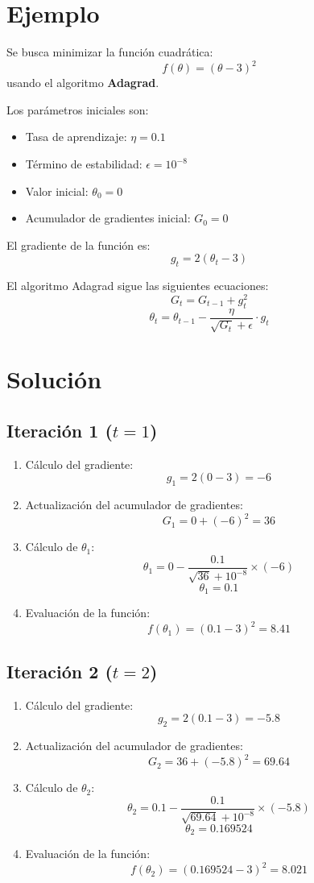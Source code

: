 \documentclass[a5paper]{article}
\begin{document}
	\section*{Ejemplo}
	Se busca minimizar la función cuadrática:
	\[
	f(\theta) = (\theta - 3)^2
	\]
	usando el algoritmo \textbf{Adagrad}. 
	
	Los parámetros iniciales son:
	\begin{itemize}
		\item Tasa de aprendizaje: \( \eta = 0.1 \)
		\item Término de estabilidad: \( \epsilon = 10^{-8} \)
		\item Valor inicial: \( \theta_0 = 0 \)
		\item Acumulador de gradientes inicial: \( G_0 = 0 \)
	\end{itemize}
	
	El gradiente de la función es:
	\[
	g_t = 2(\theta_t - 3)
	\]
	
	El algoritmo Adagrad sigue las siguientes ecuaciones:
	\[
	G_t = G_{t-1} + g_t^2
	\]
	\[
	\theta_t = \theta_{t-1} - \frac{\eta}{\sqrt{G_t} + \epsilon} \cdot g_t
	\]
	
	\section*{Solución}
	
	\subsection*{Iteración 1 (\( t = 1 \))}
	
	\begin{enumerate}
		\item Cálculo del gradiente:
		\[
		g_1 = 2(0 - 3) = -6
		\]
		\item Actualización del acumulador de gradientes:
		\[
		G_1 = 0 + (-6)^2 = 36
		\]
		\item Cálculo de \( \theta_1 \):
		\[
		\theta_1 = 0 - \frac{0.1}{\sqrt{36} + 10^{-8}} \times (-6)
		\]
		\[
		\theta_1 = 0.1
		\]
		\item Evaluación de la función:
		\[
		f(\theta_1) = (0.1 - 3)^2 = 8.41
		\]
	\end{enumerate}
	
	\subsection*{Iteración 2 (\( t = 2 \))}
	
	\begin{enumerate}
		\item Cálculo del gradiente:
		\[
		g_2 = 2(0.1 - 3) = -5.8
		\]
		\item Actualización del acumulador de gradientes:
		\[
		G_2 = 36 + (-5.8)^2 = 69.64
		\]
		\item Cálculo de \( \theta_2 \):
		\[
		\theta_2 = 0.1 - \frac{0.1}{\sqrt{69.64} + 10^{-8}} \times (-5.8)
		\]
		\[
		\theta_2 = 0.169524
		\]
		\item Evaluación de la función:
		\[
		f(\theta_2) = (0.169524 - 3)^2 = 8.021
		\]
	\end{enumerate}
	
\end{document}
